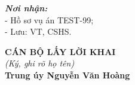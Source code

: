 \documentclass[12pt,a4paper]{article}
\begin{document}
\vspace{0.8cm}

\noindent
\begin{minipage}[t]{0.45\textwidth}
    \small
    \textbf{\textit{Nơi nhận:}}\\
    - Hồ sơ vụ án TEST-99;\\
    - Lưu: VT, CSHS.
\end{minipage}
\hfill
\begin{minipage}[t]{0.5\textwidth}
    \begin{center}
        \small
        \textbf{CÁN BỘ LẤY LỜI KHAI}\\
        \textit{(Ký, ghi rõ họ tên)}\\[1.5cm]
        \textbf{Trung úy Nguyễn Văn Hoàng}
    \end{center}
\end{minipage}
\end{document}
